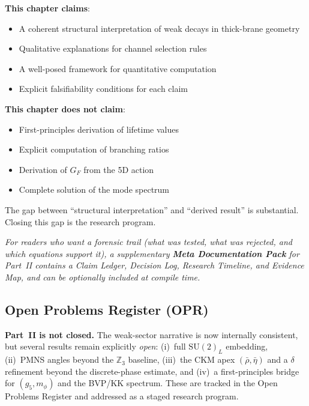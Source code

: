 \begin{tcolorbox}[readerContract, title={Final Epistemic Statement}]
\textbf{This chapter claims}:
\begin{itemize}[nosep]
  \item A coherent structural interpretation of weak decays in thick-brane geometry
  \item Qualitative explanations for channel selection rules
  \item A well-posed framework for quantitative computation
  \item Explicit falsifiability conditions for each claim
\end{itemize}

\textbf{This chapter does not claim}:
\begin{itemize}[nosep]
  \item First-principles derivation of lifetime values
  \item Explicit computation of branching ratios
  \item Derivation of $G_F$ from the 5D action
  \item Complete solution of the mode spectrum
\end{itemize}

The gap between ``structural interpretation'' and ``derived result'' is
substantial. Closing this gap is the research program.
\end{tcolorbox}

\vspace{0.5em}
\noindent\textit{For readers who want a forensic trail (what was tested, what was rejected,
and which equations support it), a supplementary \textbf{Meta Documentation Pack} for Part~II
contains a Claim Ledger, Decision Log, Research Timeline, and Evidence Map, and can be
optionally included at compile time.}

\subsection{Open Problems Register (OPR)}
\label{sec:opr}

\begin{tcolorbox}[colback=yellow!4, colframe=yellow!60!black,
    title=\textbf{Open Status (Part II)}]
\textbf{Part~II is not closed.} The weak-sector narrative is now internally
consistent, but several results remain explicitly \emph{open}: (i)~full
$\mathrm{SU}(2)_L$ embedding, (ii)~PMNS angles beyond the $\mathbb{Z}_3$
baseline, (iii)~the CKM apex $(\bar\rho, \bar\eta)$ and a $\delta$ refinement
beyond the discrete-phase estimate, and (iv)~a first-principles bridge for
$(g_5, m_\phi)$ and the BVP/KK spectrum. These are tracked in the Open
Problems Register and addressed as a staged research program.
\end{tcolorbox}

